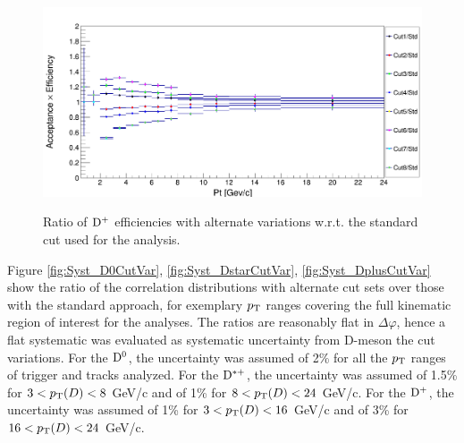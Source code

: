 \begin{figure}[!htbp]
\centering
{\includegraphics[width=0.70\linewidth, height=0.43\linewidth]{figures/Systematics/Dplus/Eff/EffcmpratioDplus.png}}
\caption{Ratio of ${\rm D^+}$ efficiencies with alternate variations w.r.t. the standard cut used for the analysis.}
\label{fig:DpluseffVars}
\end{figure}

Figure \ref{fig:Syst_D0CutVar}, \ref{fig:Syst_DstarCutVar}, \ref{fig:Syst_DplusCutVar} show the ratio of the correlation distributions with alternate cut sets over those with the standard approach, for exemplary $p_{\rm T}$ ranges covering the full kinematic region of interest for the analyses. The ratios are reasonably flat in $\Delta\varphi$, hence a flat systematic was evaluated as systematic uncertainty from D-meson the cut variations. For the ${\rm D^0}$, the uncertainty was assumed of 2\% for all the $p_{\rm T}$ ranges of trigger and tracks analyzed. For the ${\rm D^{*+}}$, the uncertainty was assumed of 1.5\% for $3 < p_{\rm T}(D) < 8$ GeV/c and of 1\% for $8 < p_{\rm T}(D) < 24$ GeV/c. For the ${\rm D^+}$, the uncertainty was assumed of 1\% for $3 < p_{\rm T}(D) < 16$ GeV/c and of 3\% for $16 < p_{\rm T}(D) < 24$ GeV/c.

